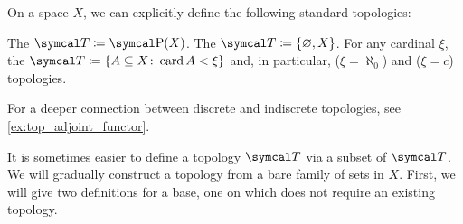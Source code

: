 \begin{definition}\label{def:standard_topologies}
  On a space \( X \), we can explicitly define the following standard topologies:
  \begin{defenum}
     The  \( \Cal{T} \coloneqq \Power(X) \).
     The  \( \Cal{T} \coloneqq \{ \varnothing, X \} \).
     For any cardinal \( \xi \), the  \( \Cal{T} \coloneqq \{ A \subseteq X \colon \Card A < \xi \} \) and, in particular,  (\( \xi = \aleph_0 \)) and  (\( \xi = c \)) topologies.
  \end{defenum}

  For a deeper connection between discrete and indiscrete topologies, see \cref{ex:top_adjoint_functor}.
\end{definition}

\begin{remark}\label{remark:abritrary_family_to_topology}
  It is sometimes easier to define a topology \( \Cal{T} \) via a subset of \( \Cal{T} \). We will gradually construct a topology from a bare family of sets in \( X \). First, we will give two definitions for a base, one on which does not require an existing topology.
\end{remark}


